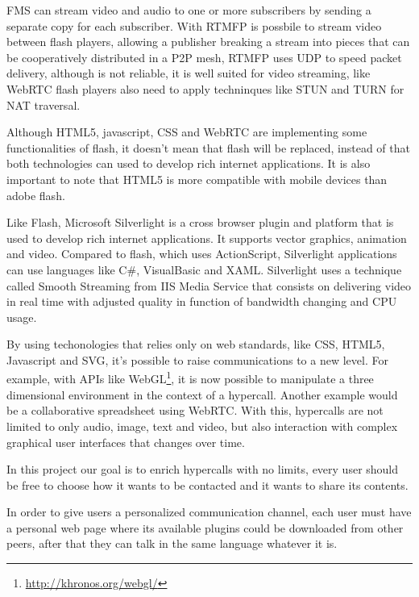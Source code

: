   \ac{FMS} can stream video and audio to one or more subscribers by sending a separate copy for each subscriber. With \ac{RTMFP} is possbile to stream video between flash players, allowing a publisher breaking a stream into pieces that can be cooperatively distributed in a P2P mesh, \ac{RTMFP} uses \ac{UDP} to speed packet delivery, although is not reliable, it is well suited for video streaming, like \ac{WebRTC} flash players also need to apply techninques like \ac{STUN} and \ac{TURN} for \ac{NAT} traversal.

  Although \ac{HTML}5, javascript, \ac{CSS} and \ac{WebRTC} are implementing some functionalities of flash, it doesn't mean that flash will be replaced, instead of that both technologies can used to develop rich internet applications. It is also important to note that \ac{HTML}5 is more compatible with mobile devices than adobe flash.

  Like Flash, Microsoft Silverlight is a cross browser plugin and platform that is used to develop rich internet applications. It supports vector graphics, animation and video. Compared to flash, which uses ActionScript, Silverlight applications can use languages like C\#, VisualBasic and \ac{XAML}. Silverlight uses a technique called Smooth Streaming from IIS Media Service that consists on delivering video in real time with adjusted quality in function of bandwidth changing and \ac{CPU} usage.



  By using techonologies that relies only on web standards, like \ac{CSS}, \ac{HTML}5, Javascript and \ac{SVG}, it's possible to raise communications to a new level. For example, with \ac{API}s like WebGL\footnote{\url{http://khronos.org/webgl/}}, it is now possible to manipulate a three dimensional environment in the context of a hypercall. Another example would be a collaborative spreadsheet using WebRTC. With this, hypercalls are not limited to only audio, image, text and video, but also interaction with complex graphical user interfaces that changes over time.

  In this project our goal is to enrich hypercalls with no limits, every user should be free to choose how it wants to be contacted and it wants to share its contents.

  In order to give users a personalized communication channel, each user must have a personal web page where its available plugins could be downloaded from other peers, after that they can talk in the same language whatever it is.
